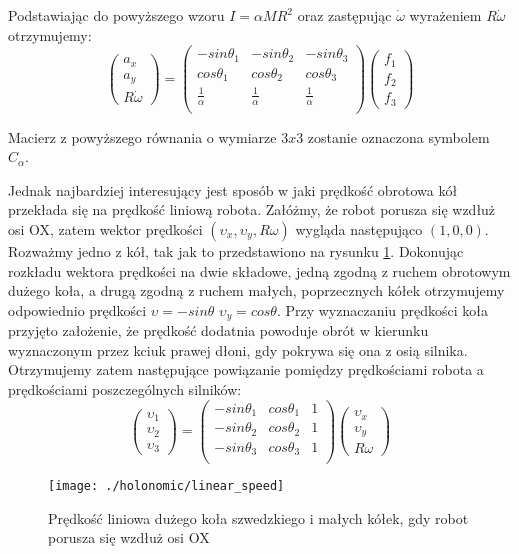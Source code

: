 Podstawiając do powyższego wzoru $I=\alpha MR^2$ oraz zastępując $\dot{\omega}$ wyrażeniem $R\dot{\omega}$ otrzymujemy:
\begin{equation}
 \begin{pmatrix}
  a_x\\
  a_y\\
  R\dot{\omega}
 \end{pmatrix}
  =
\begin{pmatrix}
  -sin\theta_1 & -sin\theta_2 & -sin\theta_3 \\
  cos\theta_1 & cos\theta_2 & cos\theta_3 \\
  \frac{1}{\alpha} & \frac{1}{\alpha} & \frac{1}{\alpha}\\
 \end{pmatrix} 
 \begin{pmatrix}
  f_1\\
  f_2\\
  f_3
 \end{pmatrix}
\end{equation}

Macierz z powyższego równania o wymiarze $3x3$ zostanie oznaczona symbolem~$C_{\alpha}$.

Jednak najbardziej interesujący jest sposób w jaki prędkość obrotowa kół przekłada się na prędkość liniową robota.
Załóżmy, że robot porusza się wzdłuż osi OX, zatem wektor prędkości $(\upsilon_{x}, \upsilon_{y}, R\omega)$ wygląda następująco $(1,0,0)$.
Rozważmy jedno z kół, tak jak to przedstawiono na rysunku \ref{fig:linear_speed}. Dokonując rozkładu wektora prędkości na dwie składowe, jedną zgodną z ruchem
obrotowym dużego koła, a drugą zgodną z ruchem małych, poprzecznych kółek otrzymujemy odpowiednio prędkości $\upsilon=-sin\theta$ $\upsilon_{y}=cos\theta$.
Przy wyznaczaniu prędkości koła przyjęto założenie, że prędkość dodatnia powoduje obrót w kierunku wyznaczonym przez kciuk prawej dłoni, gdy pokrywa się ona z osią 
silnika.
Otrzymujemy zatem następujące powiązanie pomiędzy prędkościami robota a prędkościami poszczególnych silników:
 \begin{equation}
 \begin{pmatrix}
  \upsilon_1\\
  \upsilon_2\\
  \upsilon_3
 \end{pmatrix}
  =
\begin{pmatrix}
  -sin\theta_1 & cos\theta_1 & 1 \\
  -sin\theta_2 & cos\theta_2 & 1 \\
  -sin\theta_3 & cos\theta_3 & 1 \\
 \end{pmatrix} 
 \begin{pmatrix}
  \upsilon_x\\
  \upsilon_y\\
  R\omega
 \end{pmatrix}
\end{equation}
\begin{figure}[h]
\centering
\texttt{[image: ./holonomic/linear\_speed]}
\caption{ Prędkość liniowa dużego koła szwedzkiego i małych kółek, gdy robot porusza się wzdłuż osi OX }\label{fig:linear_speed}
\end{figure}

